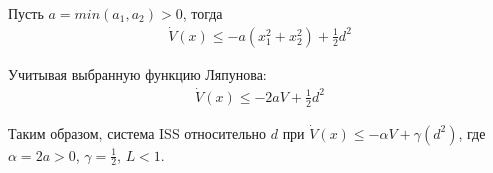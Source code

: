 Пусть $a = min(a_1, a_2) > 0$, тогда
\begin{align*}
    \dot{V}(x) \le -a(x_1^2 + x_2^2) + \frac{1}{2} d^2
\end{align*}

Учитывая выбранную функцию Ляпунова:
\begin{align*}
    \dot{V}(x) \le -2aV + \frac{1}{2} d^2
\end{align*}

Таким образом, система ISS относительно $d$ при $\dot{V}(x) \le -\alpha V + \gamma(d^2)$,
где $\alpha=2a>0$, $\gamma=\frac{1}{2}$, $L<1$.